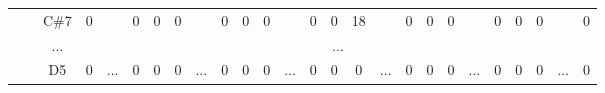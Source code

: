 \documentclass[12pt]{article}
\begin{document}
\begin{table}[!ht]
{\begin{tabular}{clcccccccccccccccccccccccc}
									& \multicolumn{1}{l|}{} & \multicolumn{1}{c|}{C\#7} & \multicolumn{1}{c|}{0}    & \multicolumn{1}{c|}{}                     & \multicolumn{1}{c|}{0}    & \multicolumn{1}{c|}{0}    & \multicolumn{1}{c|}{0}  & \multicolumn{1}{c|}{}                     & \multicolumn{1}{c|}{0}  & \multicolumn{1}{c|}{0}  & \multicolumn{1}{c|}{0}  & \multicolumn{1}{c|}{}                     & \multicolumn{1}{c|}{0}    & \multicolumn{1}{c|}{0}    & \multicolumn{1}{c|}{18}   & \multicolumn{1}{c|}{}                     & \multicolumn{1}{c|}{0}  & \multicolumn{1}{c|}{0}  & \multicolumn{1}{c|}{0}    & \multicolumn{1}{c|}{}                     & \multicolumn{1}{c|}{0}    & \multicolumn{1}{c|}{0}    & \multicolumn{1}{c|}{0}  & \multicolumn{1}{c|}{}                     & \multicolumn{1}{c|}{0}  \\ \cline{3-4} \cline{6-8} \cline{10-12} \cline{14-16} \cline{18-20} \cline{22-24} \cline{26-26} 
									& \multicolumn{1}{l|}{} & \multicolumn{1}{c|}{...}  & \multicolumn{23}{c|}{...}                                                                                                                                                                                                                                                                                                                                                                                                                                                                                                                                                                                                                                                                                                                         \\ \cline{3-4} \cline{6-8} \cline{10-12} \cline{14-16} \cline{18-20} \cline{22-24} \cline{26-26} 
									& \multicolumn{1}{l|}{} & \multicolumn{1}{c|}{D5}   & \multicolumn{1}{c|}{0}    & \multicolumn{1}{c|}{\multirow{3}{*}{...}} & \multicolumn{1}{c|}{0}    & \multicolumn{1}{c|}{0}    & \multicolumn{1}{c|}{0}  & \multicolumn{1}{c|}{\multirow{3}{*}{...}} & \multicolumn{1}{c|}{0}  & \multicolumn{1}{c|}{0}  & \multicolumn{1}{c|}{0}  & \multicolumn{1}{c|}{\multirow{3}{*}{...}} & \multicolumn{1}{c|}{0}    & \multicolumn{1}{c|}{0}    & \multicolumn{1}{c|}{0}    & \multicolumn{1}{c|}{\multirow{3}{*}{...}} & \multicolumn{1}{c|}{0}  & \multicolumn{1}{c|}{0}  & \multicolumn{1}{c|}{0}    & \multicolumn{1}{c|}{\multirow{3}{*}{...}} & \multicolumn{1}{c|}{0}    & \multicolumn{1}{c|}{0}    & \multicolumn{1}{c|}{0}  & \multicolumn{1}{c|}{\multirow{3}{*}{...}} & \multicolumn{1}{c|}{0}  \\ \cline{3-4} \cline{6-8} \cline{10-12} \cline{14-16} \cline{18-20} \cline{22-24} \cline{26-26} 

\end{tabular}}
\end{table}
\end{document}

